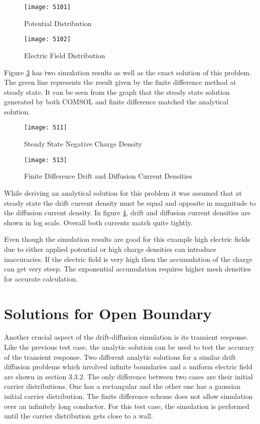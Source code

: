 \begin{doublespace}
\begin{figure}
\centering
\texttt{[image: 5101]}
\caption{Potential Distribution} 
\label{5pot}
\end{figure}

\begin{figure}
\centering
\texttt{[image: 5102]}
\caption{Electric Field Distribution} 
\label{5E}
\end{figure}

\clearpage

Figure  \ref{5ss} has two simulation results as well as the exact solution of this problem. The green line represents the result given by the finite difference method at steady state. It can be seen from the graph that the steady state solution generated by both COMSOL and finite difference matched the analytical solution.

\begin{figure}
\centering
\texttt{[image: 511]}
\caption{Steady State Negative Charge Density} 
\label{5ss}
\end{figure}

\begin{figure}[!htp]
\centering
\texttt{[image: 513]}
\caption{Finite Difference Drift and Diffusion Current Densities}
 \label{5curdens}
\end{figure}

While deriving an analytical solution for this problem it was assumed that at steady state the drift current density must be equal and opposite in magnitude to the diffusion current density. In figure \ref{5curdens}, drift and diffusion current densities are shown in log scale. Overall both currents match quite tightly.

Even though the simulation results are good for this example high electric fields due to either applied potential or high charge densities can introduce inaccuracies. If the electric field is very high then the accumulation of the charge can get very steep. The exponential accumulation requires higher mesh densities for accurate calculation.

\clearpage
\section{Solutions for Open Boundary}
Another crucial aspect of the drift-diffusion simulation is its transient response. Like the previous test case, the analytic solution can be used to test the accuracy of the transient response. Two different analytic solutions for a similar drift diffusion problems which involved infinite boundaries and a uniform electric field are shown in section 3.3.2. The only difference between two cases are their initial carrier distributions. One has a rectangular and the other one has a gaussian initial carrier distribution. The finite difference scheme does not allow simulation over an infinitely long conductor. For this test case, the simulation is performed until the carrier distribution gets close to a wall.   


\end{doublespace}
